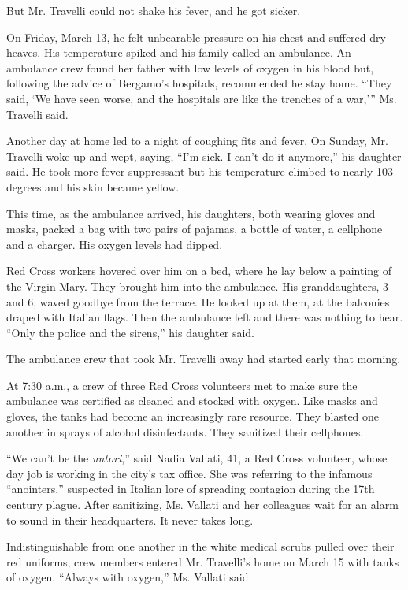 But Mr. Travelli could not shake his fever, and he got sicker.

On Friday, March 13, he felt unbearable pressure on his chest and
suffered dry heaves. His temperature spiked and his family called an
ambulance. An ambulance crew found her father with low levels of oxygen
in his blood but, following the advice of Bergamo's hospitals,
recommended he stay home. ``They said, `We have seen worse, and the
hospitals are like the trenches of a war,''' Ms. Travelli said.

Another day at home led to a night of coughing fits and fever. On
Sunday, Mr. Travelli woke up and wept, saying, ``I'm sick. I can't do it
anymore,'' his daughter said. He took more fever suppressant but his
temperature climbed to nearly 103 degrees and his skin became yellow.

This time, as the ambulance arrived, his daughters, both wearing gloves
and masks, packed a bag with two pairs of pajamas, a bottle of water, a
cellphone and a charger. His oxygen levels had dipped.

Red Cross workers hovered over him on a bed, where he lay below a
painting of the Virgin Mary. They brought him into the ambulance. His
granddaughters, 3 and 6, waved goodbye from the terrace. He looked up at
them, at the balconies draped with Italian flags. Then the ambulance
left and there was nothing to hear. ``Only the police and the sirens,''
his daughter said.

The ambulance crew that took Mr. Travelli away had started early that
morning.

At 7:30 a.m., a crew of three Red Cross volunteers met to make sure the
ambulance was certified as cleaned and stocked with oxygen. Like masks
and gloves, the tanks had become an increasingly rare resource. They
blasted one another in sprays of alcohol disinfectants. They sanitized
their cellphones.

``We can't be the \emph{untori},'' said Nadia Vallati, 41, a Red Cross
volunteer, whose day job is working in the city's tax office. She was
referring to the infamous ``anointers,'' suspected in Italian lore of
spreading contagion during the 17th century plague. After sanitizing,
Ms. Vallati and her colleagues wait for an alarm to sound in their
headquarters. It never takes long.

Indistinguishable from one another in the white medical scrubs pulled
over their red uniforms, crew members entered Mr. Travelli's home on
March 15 with tanks of oxygen. ``Always with oxygen,'' Ms. Vallati said.

